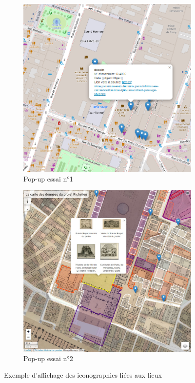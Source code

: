 \begin{figure}[h!]
    \begin{subfigure}{.5\textwidth}
      \centering
    \includegraphics[width=.7\linewidth]{images/pop-up-old.png}
    \caption{Pop-up essai n°1 }
    \label{fig:pop-up-old}
    \end{subfigure}
    \begin{subfigure}{.5\textwidth}
      \centering
    \includegraphics[width=.7\linewidth]{images/pop-up.jpeg}
    \caption{Pop-up essai n°2}
    \label{fig:pop-up}
    \end{subfigure}
    \caption{Exemple d'affichage des iconographies liées aux lieux}
\label{fig:pop-up-all}
\end{figure}

